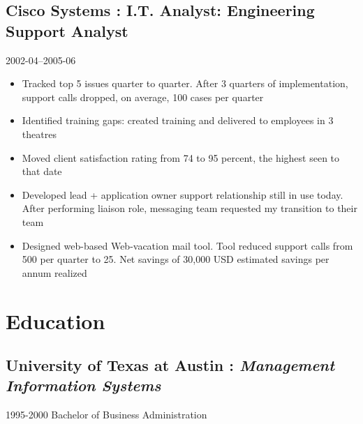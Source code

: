 \documentclass[]{article}
\begin{document}
\subsection*{Cisco Systems : I.T. Analyst: Engineering Support Analyst}
  \label{ciscosystems_rdfa_cisco_2_title:_rdfa_cisco_2_desc}
  2002-04--2005-06
\begin{itemize}
    \item{Tracked top 5 issues quarter to quarter. After 3 quarters of implementation, support calls dropped, on average, 100 cases per quarter}
    \item{Identified training gaps: created training and delivered to employees in 3 theatres}
    \item{Moved client satisfaction rating from 74 to 95 percent, the highest seen to that date}
    \item{Developed lead + application owner support relationship still in use today. After performing liaison role, messaging team requested my transition to their team}
    \item{Designed web-based Web-vacation mail tool. Tool reduced support calls from 500 per quarter to 25. Net savings of 30,000 USD estimated savings per annum realized
}
\end{itemize}
       


























\section*{Education}


	\subsection*{\textbf{University of Texas at Austin} : \textit{Management Information Systems}}
  \label{_universityoftexasataustin_managementinformationsystems}
  \textsf{1995-2000}
\vspace{0.02in}
Bachelor of Business Administration\\
\end{document}
